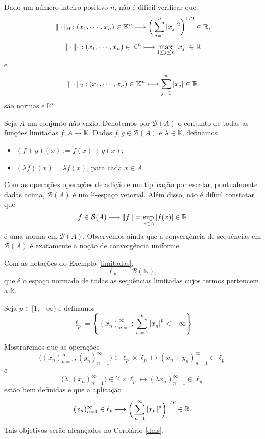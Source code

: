 \begin{example}\label{ex21}
    Dado um número inteiro positivo $n$, não é difícil verificar que
    \[
    \displaystyle \|\cdot \|_0 : (x_1,\cdots , x_n) \in \mathbb K^n \longmapsto \bigg( \sum_{j=1}^{n} |x_j|^2\bigg)^{1/2} \in \mathbb{R} ,
    \]
    \[
    \displaystyle \|\cdot \|_1 : (x_1,\cdots , x_n) \in \mathbb K^n \longmapsto \max_{1\leq j \leq n} |x_j| \in \mathbb{R} 
    \]
    e
    \[
    \displaystyle \|\cdot \|_2 : (x_1,\cdots , x_n) \in \mathbb K^n \longmapsto \sum_{j=1}^{n} |x_j| \in \mathbb{R} 
    \]
    são normas e $\mathbb K ^n$.
\end{example}

\begin{example}\label{limitadas}
Seja $A$ um conjunto não vazio. Denotemos por $\mathcal B (A)$ o conjunto de todas as funções limitadas $f: A\longrightarrow \mathbb K$. Dados $f,g \in \mathcal B (A)$ e $\lambda \in \mathbb K$, definamos
\begin{itemize}
\item $(f+g)(x):=f(x)+g(x)$; 
\item $(\lambda f)(x) = \lambda f(x)$,
para cada $x\in A$.
\end{itemize}
Com as operações operações de adição e multiplicação por escalar, pontualmente dadas acima, $\mathcal B (A)$ é um $\mathbb K$-espaço vetorial. Além disso, não é difícil constatar que
\[
\displaystyle f\in \mathcal B (A) \longmapsto \| f\| = \sup_{x\in A} |f(x)| \in \mathbb{R}
\]
é uma norma em $\mathcal B (A)$. Observemos ainda que a convergência de sequências em $\mathcal B (A)$ é exatamente a noção de convergência uniforme. 
\end{example}

\begin{definition}
    Com as notações do Exemplo \ref{limitadas},
    \[
    \ell_{\infty} := \mathcal B (\mathbb N),
    \]
    que é o espaço normado de todas as sequências limitadas cujos termos pertencem a $\mathbb K$.
\end{definition}

\begin{example}\label{lp}
    Seja $p\in [1,+\infty )$ e definamos 
    \[
    \displaystyle \ell_p =\left\{ (x_n )_{n=1}^{\infty}; \sum_{n=1}^{\infty} |x_n|^p <+\infty \right\}
    \]
    
    Mostraremos que as operações 
    \[
    \bigg( (x_n )_{n=1}^{\infty},(y_n )_{n=1}^{\infty} \bigg) \in \ell_p \times \ell_p \longmapsto (x_n +y_n )_{n=1}^{\infty} \in \ell_p
    \]
    e
    \[
    \bigg( \lambda ,(x_n )_{n=1}^{\infty} \bigg) \in \mathbb K \times \ell_p \longmapsto (\lambda x_n )_{n=1}^{\infty} \in \ell_p
    \]
    estão bem definidas e que a aplicação 
    \[
    \displaystyle (x_n )_{n=1}^{\infty} \in \ell_p \longmapsto \bigg( \sum_{n=1}^{\infty} |x_n|^p \bigg)^{1/p} \in \mathbb{R} .
    \]
    Tais objetivos serão alcançados no Corolário \ref{dms}.
\end{example}

